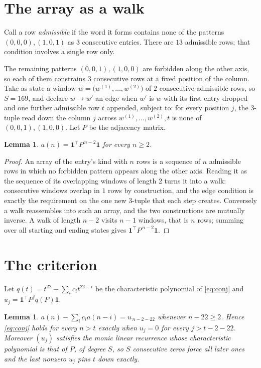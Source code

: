 \documentclass[11pt,a4paper]{article}
\theoremstyle{plain}
\newtheorem{lemma}[theorem]{Lemma}
\theoremstyle{definition}
\begin{document}
\section{The array as a walk}

Call a row \emph{admissible} if the word it forms contains none of the patterns
$(0,0,0), (1,0,1)$ as $3$ consecutive entries. There are $13$ admissible rows; that condition
involves a single row only.

The remaining patterns $(0,0,1), (1,0,0)$ are forbidden along the other axis, so each of them
constrains $3$ consecutive rows at a fixed position of the column. Take as state a
window $w=\bigl(w^{(1)},\dots,w^{(2)}\bigr)$ of $2$ consecutive admissible
rows, so $S=169$, and declare $w\to w'$ an edge when $w'$ is $w$ with its first entry
dropped and one further admissible row $t$ appended, subject to: for every position
$j$, the $3$-tuple read down the column $j$ across $w^{(1)},\dots,w^{(2)},t$
is none of $(0,0,1), (1,0,0)$. Let $P$ be the adjacency matrix.

\begin{lemma}\label{lem:walk}
$a(n)=\mathbf{1}^{\!\top}P^{\,n-2}\mathbf{1}$ for every $n\ge2$.
\end{lemma}

\begin{proof}
An array of the entry's kind with $n$ rows is a sequence of $n$ admissible rows in
which no forbidden pattern appears along the other axis. Reading it as the sequence of its
overlapping windows of length $2$ turns it into a walk: consecutive windows overlap in
$1$ rows by construction, and the edge condition is exactly the requirement on the one
new $3$-tuple that each step creates. Conversely a walk reassembles into such an array,
and the two constructions are mutually inverse. A walk of length $n-2$ visits $n-1$
windows, that is $n$ rows; summing over all starting and ending states gives
$\mathbf{1}^{\!\top}P^{\,n-2}\mathbf{1}$.
\end{proof}

\section{The criterion}

Let $q(t)=t^{22}-\sum_i c_i t^{22-i}$ be the characteristic polynomial of
\eqref{eq:conj} and $u_j=\mathbf{1}^{\!\top}P^{j}q(P)\mathbf{1}$.

\begin{lemma}\label{lem:crit}
$a(n)-\sum_i c_i a(n-i)=u_{\,n-2-22}$ whenever $n-22\ge2$. Hence
\eqref{eq:conj} holds for every $n>t$ exactly when $u_j=0$ for every
$j>t-2-22$. Moreover $(u_j)$ satisfies the monic linear recurrence whose
characteristic polynomial is that of $P$, of degree $S$, so $S$ consecutive zeros force all
later ones and the last nonzero $u_j$ pins $t$ down exactly.
\end{lemma}
\end{document}
